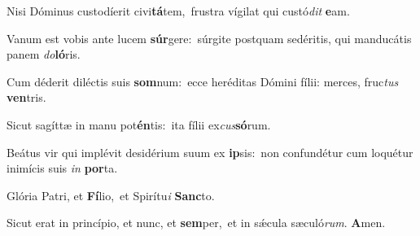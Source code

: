 Nisi Dóminus custodíerit civi\textbf{tá}tem,~\redgreheightstar frustra vígilat qui custó\textit{dit} \textbf{e}am.

Vanum est vobis ante lucem \textbf{súr}gere:~\redgreheightstar súrgite postquam sedéritis, qui manducátis panem \textit{do}\textbf{ló}ris.

Cum déderit diléctis suis \textbf{som}num:~\redgreheightstar ecce heréditas Dómini fílii: merces, fruc\textit{tus} \textbf{ven}tris.

Sicut sagíttæ in manu pot\textbf{én}tis:~\redgreheightstar ita fílii ex\textit{cus}\textbf{só}rum.

Beátus vir qui implévit desidérium suum ex \textbf{ip}sis:~\redgreheightstar non confundétur cum loquétur inimícis suis \textit{in} \textbf{por}ta.

Glória Patri, et \textbf{Fí}lio,~\redgreheightstar et Spirítu\textit{i} \textbf{Sanc}to.

Sicut erat in princípio, et nunc, et \textbf{sem}per,~\redgreheightstar et in sǽcula sæculó\textit{rum}. \textbf{A}men.

